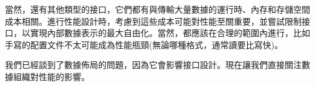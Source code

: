 當然，還有其他類型的接口，它們都有與傳輸大量數據的運行時、內存和存儲空間成本相關。進行性能設計時，考慮到這些成本可能對性能至關重要，並嘗試限制接口，以實現內部數據表示的最大自由化。當然，都應該在合理的範圍內進行，比如手寫的配置文件不太可能成為性能瓶頸(無論哪種格式，通常讀要比寫快)。 

我們已經談到了數據佈局的問題，因為它會影響接口設計。現在讓我們直接關注數據組織對性能的影響。


























